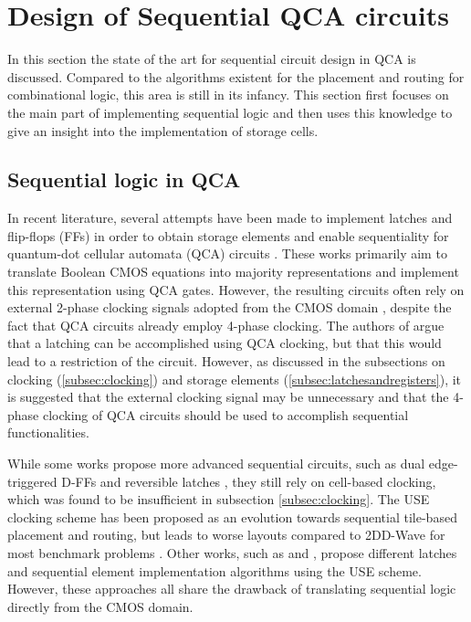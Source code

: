 \section{Design of Sequential QCA circuits}
In this section the state of the art for sequential circuit design in QCA is discussed. Compared to the algorithms existent for the placement and routing for combinational logic, this area is still in its infancy. This section first focuses on the main part of implementing sequential logic and then uses this knowledge to give an insight into the implementation of storage cells. 

\subsection{Sequential logic in QCA}
In recent literature, several attempts have been made to implement latches and flip-flops (FFs) in order to obtain storage elements and enable sequentiality for quantum-dot cellular automata (QCA) circuits \cite{sequential_cell_one, sequential_cell_two, dual_edge_triggered_FF_cell, sequential_reversible_cell}. These works primarily aim to translate Boolean CMOS equations into majority representations and implement this representation using QCA gates. However, the resulting circuits often rely on external 2-phase clocking signals adopted from the CMOS domain \cite{sequential_cell_one}, despite the fact that QCA circuits already employ 4-phase clocking. The authors of \cite{sequential_cell_two} argue that a latching can be accomplished using QCA clocking, but that this would lead to a restriction of the circuit. However, as discussed in the subsections on clocking (\ref{subsec:clocking}) and storage elements (\ref{subsec:latchesandregisters}), it is suggested that the external clocking signal may be unnecessary and that the 4-phase clocking of QCA circuits should be used to accomplish sequential functionalities.

While some works propose more advanced sequential circuits, such as dual edge-triggered D-FFs \cite{dual_edge_triggered_FF_cell} and reversible latches \cite{sequential_reversible_cell}, they still rely on cell-based clocking, which was found to be insufficient in subsection \ref{subsec:clocking}. The USE clocking scheme \cite{USE} has been proposed as an evolution towards sequential tile-based placement and routing, but leads to worse layouts compared to 2DD-Wave for most benchmark problems \cite{walter2022exact}. Other works, such as \cite{sequential_reversible_tile} and \cite{sequential_tile_CMOS_alg}, propose different latches and sequential element implementation algorithms using the USE scheme. However, these approaches all share the drawback of translating sequential logic directly from the CMOS domain.

